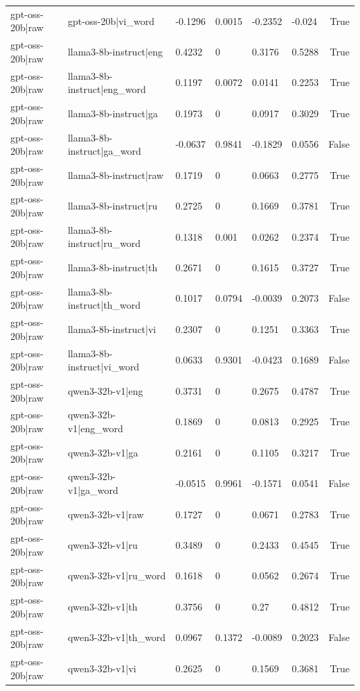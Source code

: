 \begin{table}
\begin{tabular}{llllllr}
gpt-oss-20b|raw & gpt-oss-20b|vi_word & -0.1296 & 0.0015 & -0.2352 & -0.024 & True \\
gpt-oss-20b|raw & llama3-8b-instruct|eng & 0.4232 & 0 & 0.3176 & 0.5288 & True \\
gpt-oss-20b|raw & llama3-8b-instruct|eng_word & 0.1197 & 0.0072 & 0.0141 & 0.2253 & True \\
gpt-oss-20b|raw & llama3-8b-instruct|ga & 0.1973 & 0 & 0.0917 & 0.3029 & True \\
gpt-oss-20b|raw & llama3-8b-instruct|ga_word & -0.0637 & 0.9841 & -0.1829 & 0.0556 & False \\
gpt-oss-20b|raw & llama3-8b-instruct|raw & 0.1719 & 0 & 0.0663 & 0.2775 & True \\
gpt-oss-20b|raw & llama3-8b-instruct|ru & 0.2725 & 0 & 0.1669 & 0.3781 & True \\
gpt-oss-20b|raw & llama3-8b-instruct|ru_word & 0.1318 & 0.001 & 0.0262 & 0.2374 & True \\
gpt-oss-20b|raw & llama3-8b-instruct|th & 0.2671 & 0 & 0.1615 & 0.3727 & True \\
gpt-oss-20b|raw & llama3-8b-instruct|th_word & 0.1017 & 0.0794 & -0.0039 & 0.2073 & False \\
gpt-oss-20b|raw & llama3-8b-instruct|vi & 0.2307 & 0 & 0.1251 & 0.3363 & True \\
gpt-oss-20b|raw & llama3-8b-instruct|vi_word & 0.0633 & 0.9301 & -0.0423 & 0.1689 & False \\
gpt-oss-20b|raw & qwen3-32b-v1|eng & 0.3731 & 0 & 0.2675 & 0.4787 & True \\
gpt-oss-20b|raw & qwen3-32b-v1|eng_word & 0.1869 & 0 & 0.0813 & 0.2925 & True \\
gpt-oss-20b|raw & qwen3-32b-v1|ga & 0.2161 & 0 & 0.1105 & 0.3217 & True \\
gpt-oss-20b|raw & qwen3-32b-v1|ga_word & -0.0515 & 0.9961 & -0.1571 & 0.0541 & False \\
gpt-oss-20b|raw & qwen3-32b-v1|raw & 0.1727 & 0 & 0.0671 & 0.2783 & True \\
gpt-oss-20b|raw & qwen3-32b-v1|ru & 0.3489 & 0 & 0.2433 & 0.4545 & True \\
gpt-oss-20b|raw & qwen3-32b-v1|ru_word & 0.1618 & 0 & 0.0562 & 0.2674 & True \\
gpt-oss-20b|raw & qwen3-32b-v1|th & 0.3756 & 0 & 0.27 & 0.4812 & True \\
gpt-oss-20b|raw & qwen3-32b-v1|th_word & 0.0967 & 0.1372 & -0.0089 & 0.2023 & False \\
gpt-oss-20b|raw & qwen3-32b-v1|vi & 0.2625 & 0 & 0.1569 & 0.3681 & True \\

\end{tabular}
\end{table}
